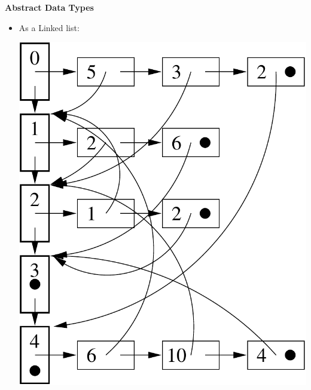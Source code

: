 \documentclass[a4,portraitt]{slides}
\begin{document}
\newpage
{\samepage
\begin{center}
{\Large{\bf Abstract Data Types}}
\end{center}
\begin{itemize}
\item As a Linked list:
\begin{center}
\includegraphics{../Images/graphll.pdf}
\end{center}
\end{itemize}
}
\end{document}

